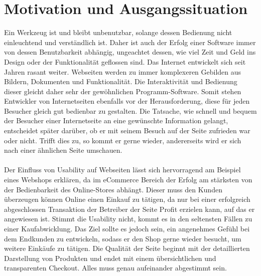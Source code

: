 %
%
%
%

\section{Motivation und Ausgangssituation}

Ein Werkzeug ist und bleibt unbenutzbar, solange dessen Bedienung nicht einleuchtend und verständlich ist. Daher ist auch der Erfolg einer Software immer von dessen Benutzbarkeit abhängig, ungeachtet dessen, wie viel Zeit und Geld ins Design oder der Funktionalität geflossen sind. Das Internet entwickelt sich seit Jahren rasant weiter. Webseiten werden zu immer komplexeren Gebilden aus Bildern, Dokumenten und Funktionalität. Die Interaktivität und Bedienung dieser gleicht daher sehr der gewöhnlichen Programm-Software. Somit stehen Entwickler von Internetseiten ebenfalls vor der Herausforderung, diese für jeden Besucher gleich gut bedienbar zu gestalten. Die Tatsache, wie schnell und bequem der Besucher einer Internetseite an eine gewünschte Information gelangt, entscheidet später darüber, ob er mit seinem Besuch auf der Seite zufrieden war oder nicht. Trifft dies zu, so kommt er gerne wieder, andererseits wird er sich nach einer ähnlichen Seite umschauen.\\
\\
Der Einfluss von Usability auf Webseiten lässt sich hervorragend am Beispiel eines Webshops erklären, da im eCommerce Bereich der Erfolg am stärksten von der Bedienbarkeit des Online-Stores abhängt. Dieser muss den Kunden überzeugen können Online einen Einkauf zu tätigen, da nur bei einer erfolgreich abgeschlossen Transaktion der Betreiber der Seite Profit erzielen kann, auf das er angewiesen ist. Stimmt die Usability nicht, kommt es in den seltensten Fällen zu einer Kaufabwicklung. Das Ziel sollte es jedoch sein, ein angenehmes Gefühl bei dem Endkunden zu entwickeln, sodass er den Shop gerne wieder besucht, um weitere Einkäufe zu tätigen. Die Qualität der Seite beginnt mit der detaillierten Darstellung von Produkten und endet mit einem übersichtlichen und transparenten Checkout. Alles muss genau aufeinander abgestimmt sein.\\
\\
\label{usability-auf-uniseiten}
